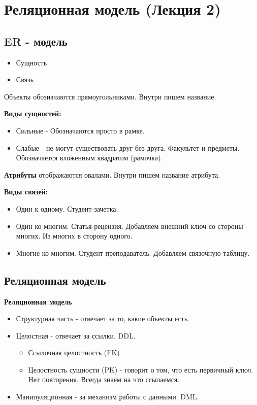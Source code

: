 \chapter{Реляционная модель (Лекция 2)}

\section{ER - модель}

\begin{itemize}
	\item Сущность
	\item Связь
\end{itemize}

Объекты обозначаются прямоугольниками. Внутри пишем название.

\textbf{Виды сущностей:}
\begin{itemize}
	\item Сильные - Обозначаются просто в рамке.
	\item Слабые - не могут существовать друг без друга. Факультет и предметы.
	      Обозначается вложенным квадратом (рамочка).
\end{itemize}

\textbf{Атрибуты} отображаются овалами. Внутри пишем название атрибута.

\textbf{Виды связей:}
\begin{itemize}
	\item Один к одному. Студент-зачетка.
	\item Один ко многим. Статья-рецензия. Добавляем внешний ключ со стороны многих.
	      Из многих в сторону одного.
	\item Многие ко многим. Студент-преподаватель. Добавляем связочную таблицу.
\end{itemize}

\section{Реляционная модель}

\textbf{Реляционная модель}
\begin{itemize}
	\item Структурная часть - отвечает за то, какие объекты есть.
	\item Целостная - отвечает за ссылки. DDL.
	      \begin{itemize}
		      \item Ссылочная целостность (FK)
		      \item Целостность сущности (PK) - говорит о том, что есть первичный ключ.
		            Нет повторения. Всегда знаем на что ссылаемся.
	      \end{itemize}
	\item Манипуляционная - за механизм работы с данными. DML.
\end{itemize}

